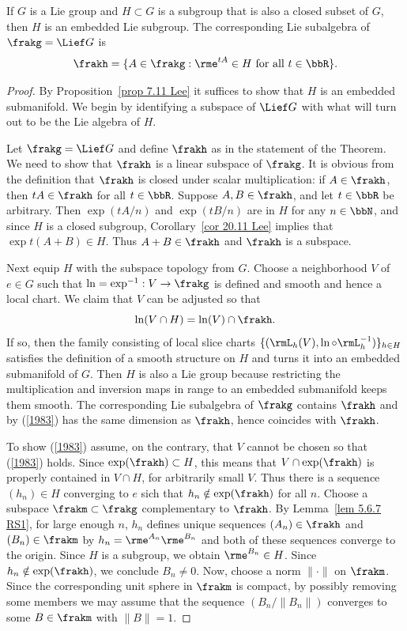\begin{thm}\label{thm closed subgroup}
    If $G$ is a Lie group and $H\subset G$ is a subgroup that is also a closed subset of $G$, then $H$ is an embedded Lie subgroup. The corresponding Lie subalgebra of $\frakg=\Lief G$ is 
    \[\frakh=\{A\in\frakg: \rme^{tA}\in H \text{ for all }t\in\bbR\}.\]
\end{thm}
\begin{proof}
    By Proposition~\ref{prop 7.11 Lee} it suffices to show that $H$ is an embedded submanifold. We begin by identifying a subspace of $\Lief G$ with what will turn out to be the Lie algebra of $H$.

    Let $\frakg=\Lief G$ and define $\frakh$ as in the statement of the Theorem. We need to show that $\frakh$ is a linear subspace of $\frakg$. It is obvious from the definition that $\frakh$ is closed under scalar multiplication: if $A\in\frakh$, then $tA\in\frakh$ for all $t\in \bbR$. Suppose $A,B\in\frakh$, and let $t \in\bbR$ be arbitrary. Then $\exp(tA/n)$ and $\exp(tB/n)$ are in $H$ for any $n\in \bbN$, and since $H$ is a closed subgroup, Corollary~\ref{cor 20.11 Lee} implies that $\exp t(A+B)\in H$. Thus $A+B\in\frakh$ and $\frakh$ is a subspace.

    Next equip $H$ with the subspace topology from $G$. Choose a neighborhood $V$ of $e\in G$ such that $\ln=\exp^{-1}:V\to \frakg$ is defined and smooth and hence a local chart. We claim that $V$ can be adjusted so that 
    \[\ln(V\cap H)=\ln(V)\cap \frakh.\label{1983}\]
    If so, then the family consisting of local slice charts $\{(\rmL_h(V),\ln\circ \rmL_{h}^{-1})\}_{h\in H}$ satisfies the definition of a smooth structure on $H$ and turns it into an embedded submanifold of $G$. Then $H$ is also a Lie group because restricting the multiplication and inversion maps in range to an embedded submanifold keeps them smooth. The corresponding Lie subalgebra of $\frakg$ contains $\frakh$ and by (\ref{1983}) has the same dimension as $\frakh$, hence coincides with $\frakh$.

    To show (\ref{1983}) assume, on the contrary, that $V$ cannot be chosen so that (\ref{1983}) holds. Since $\exp(\frakh)\subset H$, this means that $V\cap \exp(\frakh)$ is properly contained in $V\cap H$, for arbitrarily small $V$. Thus there is a sequence $(h_n)\in H$ converging to $e$ sich that $h_n\notin \exp(\frakh)$ for all $n$. Choose a subspace $\frakm\subset\frakg$ complementary to $\frakh$. By Lemma~\ref{lem 5.6.7 RS1}, for large enough $n$, $h_n$ defines unique sequences $(A_n)\in \frakh$ and $(B_n)\in \frakm$ by $h_n=\rme^{A_n}\rme^{B_n}$ and both of these sequences converge to the origin. Since $H$ is a subgroup, we obtain $\rme^{B_n}\in H$. Since $h_n\notin\exp(\frakh)$, we conclude $B_n\neq 0$. Now, choose a norm $\lVert\cdot\rVert$ on $\frakm$. Since the corresponding unit sphere in $\frakm$ is compact, by possibly removing some members we may assume that the sequence $(B_n/\lVert B_n\rVert)$ converges to some $B\in\frakm$ with $\lVert B\rVert=1$. 
    

\end{proof}
